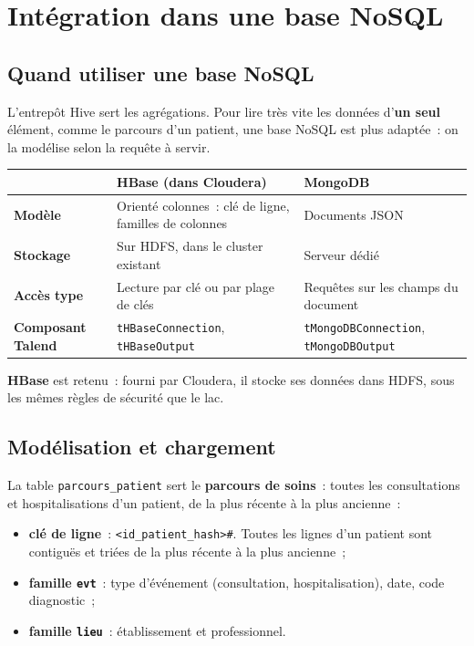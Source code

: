\newpage
\section{Intégration dans une base NoSQL}

\subsection{Quand utiliser une base NoSQL}

\noindent L'entrepôt Hive sert les agrégations. Pour lire très vite les données d'\textbf{un seul} élément, comme le parcours d'un patient, une base NoSQL est plus adaptée~: on la modélise selon la requête à servir.

\begin{center}
\small
\begin{tabularx}{\textwidth}{>{\bfseries}l >{\raggedright\arraybackslash}X >{\raggedright\arraybackslash}X}
\toprule
 & HBase (dans Cloudera) & MongoDB \\
\midrule
Modèle & Orienté colonnes~: clé de ligne, familles de colonnes & Documents JSON \\
Stockage & Sur HDFS, dans le cluster existant & Serveur dédié \\
Accès type & Lecture par clé ou par plage de clés & Requêtes sur les champs du document \\
Composant Talend & \texttt{tHBaseConnection}, \texttt{tHBaseOutput} & \texttt{tMongoDBConnection}, \texttt{tMongoDBOutput} \\
\bottomrule
\end{tabularx}
\end{center}

\noindent \textbf{HBase} est retenu~: fourni par Cloudera, il stocke ses données dans HDFS, sous les mêmes règles de sécurité que le lac.

\subsection{Modélisation et chargement}

\noindent La table \texttt{parcours\_patient} sert le \textbf{parcours de soins}~: toutes les consultations et hospitalisations d'un patient, de la plus récente à la plus ancienne~:
\begin{itemize}
	\item \textbf{clé de ligne}~: \texttt{<id\_patient\_hash>\#<date inversée>}. Toutes les lignes d'un patient sont contiguës et triées de la plus récente à la plus ancienne~;
	\item \textbf{famille \texttt{evt}}~: type d'événement (consultation, hospitalisation), date, code diagnostic~;
	\item \textbf{famille \texttt{lieu}}~: établissement et professionnel.
\end{itemize}

